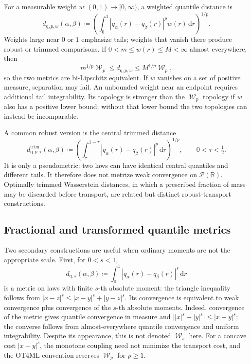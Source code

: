 \documentclass[11pt]{article}
\newcommand{\RR}{\mathbb R}
\newcommand{\Pp}{\mathcal P}
\renewcommand{\d}{\,\mathrm d}
\newcommand{\al}{\alpha}
\newcommand{\be}{\beta}
\DeclareMathOperator{\Wass}{\mathcal W}
\newcommand{\eqdef}{\coloneqq}
\begin{document}
For a measurable weight $w:(0,1)\to[0,\infty)$, a weighted quantile distance is
\begin{equation}\label{eq:weighted-quantile}
 d_{\mathrm{q},p,w}(\al,\be)
 \eqdef\left(\int_0^1 |q_\al(r)-q_\be(r)|^p w(r)\d r\right)^{1/p}.
\end{equation}
Weights large near $0$ or $1$ emphasize tails; weights that vanish there
produce robust or trimmed comparisons.  If
$0<m\leq w(r)\leq M<\infty$ almost everywhere, then
\begin{equation}\label{eq:weighted-wp-equivalence}
 m^{1/p}\Wass_p\leq d_{\mathrm{q},p,w}\leq M^{1/p}\Wass_p,
\end{equation}
so the two metrics are bi-Lipschitz equivalent.  If $w$ vanishes on a set of
positive measure, separation may fail.  An unbounded weight near an endpoint
requires additional tail integrability.  Its topology is stronger than the
$\Wass_p$ topology if $w$ also has a positive lower bound; without that lower
bound the two topologies can instead be incomparable.

A common robust version is the central trimmed distance
\begin{equation}\label{eq:trimmed-quantile}
 d_{\mathrm{q},p,\tau}^{\mathrm{trim}}(\al,\be)
 \eqdef\left(\int_\tau^{1-\tau}
 |q_\al(r)-q_\be(r)|^p\d r\right)^{1/p},
 \qquad 0<\tau<\tfrac12.
\end{equation}
It is only a pseudometric: two laws can have identical central quantiles and
different tails.  It therefore does not metrize weak convergence on
$\Pp(\RR)$.  Optimally trimmed Wasserstein distances, in which a prescribed
fraction of mass may be discarded before transport, are related but distinct
robust-transport constructions.

\subsection{Fractional and transformed quantile metrics}

Two secondary constructions are useful when ordinary moments are not the
appropriate scale.  First, for $0<s<1$,
\begin{equation}\label{eq:fractional-quantile}
 d_{\mathrm{q},s}(\al,\be)
 \eqdef\int_0^1|q_\al(r)-q_\be(r)|^s\d r
\end{equation}
is a metric on laws with finite $s$-th absolute moment: the triangle
inequality follows from $|x-z|^s\leq|x-y|^s+|y-z|^s$.  Its convergence is
equivalent to weak convergence plus convergence of the $s$-th absolute
moments.  Indeed, convergence of the metric gives quantile convergence in
measure and
$\bigl||x|^s-|y|^s\bigr|\leq|x-y|^s$; the converse follows from almost-everywhere
quantile convergence and uniform integrability.  Despite its appearance, this
is not denoted $\Wass_s$ here.  For a
concave cost $|x-y|^s$, the monotone coupling need not minimize the transport
cost, and the OT4ML convention reserves $\Wass_p$ for $p\geq1$.
\end{document}
